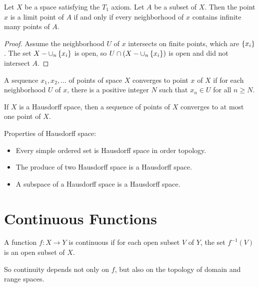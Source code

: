 \begin{theorem}
Let $X$ be a space satisfying the $T_1$ axiom. Let $A$ be a subset of $X$. Then the point $x$ is a limit point of $A$ if and only if every neighborhood of $x$ contains infinite many points of $A$.    
\end{theorem}
\begin{proof}
    Assume the neighborhood $U$ of $x$ intersects on finite points, which are $\set{x_i}$. The set $X - \cup_n \set{x_i}$ is open, so $U \cap (X - \cup_n \set{x_i})$ is open and did not intersect $A$.
\end{proof}


\begin{definition}
    A sequence $x_1, x_2, ... $ of points of space $X$ converges to point $x$ of $X$ if for each neighborhood $U$ of $x$, there is a positive integer $N$ such that $x_n \in U$ for all $n \geq N$.
\end{definition}

\begin{theorem}
If $X$ is a Hausdorff space, then a sequence of points of $X$ converges to at most one point of $X$.    
\end{theorem}

\begin{theorem}
Properties of Hausdorff space:
\begin{itemize}
    \item Every simple ordered set is Hausdorff space in order topology.
    \item The produce of two Hausdorff space is a Hausdorff space.
    \item A subspace of a Hausdorff space is a Hausdorff space. 
\end{itemize}
\end{theorem}



\section{Continuous Functions}


\begin{definition}
    A function $f: X \rightarrow Y$ is continuous if for each open subset $V$ of $Y$, the set $f^{-1}(V)$ is an open subset of $X$.
    
    So continuity depends not only on $f$, but also on the topology of domain and range spaces.
\end{definition}

